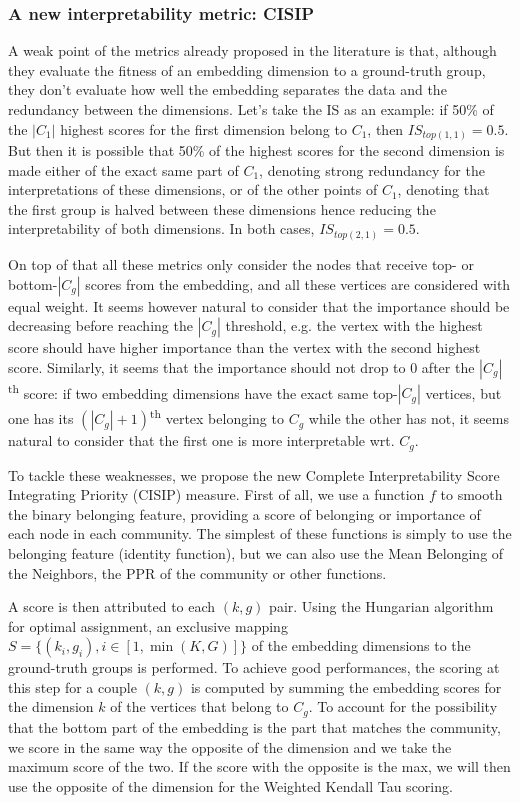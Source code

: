 \subsubsection{A new interpretability metric: CISIP}

A weak point of the metrics already proposed in the literature is that, although they evaluate the fitness of an embedding dimension to a ground-truth group, they don't evaluate how well the embedding separates the data and the redundancy between the dimensions. Let's take the IS as an example: if 50\% of the $|C_1|$ highest scores for the first dimension belong to $C_1$, then $IS_{top(1,1)} = 0.5$. But then it is possible that 50\% of the highest scores for the second dimension is made either of the exact same part of $C_1$, denoting strong redundancy for the interpretations of these dimensions, or of the other points of $C_1$, denoting that the first group is halved between these dimensions hence reducing the interpretability of both dimensions. In both cases, $IS_{top(2, 1)} = 0.5$.

On top of that all these metrics only consider the nodes that receive top- or bottom-$|C_g|$ scores from the embedding, and all these vertices are considered with equal weight. It seems however natural to consider that the importance should be decreasing before reaching the $|C_g|$ threshold, e.g. the vertex with the highest score should have higher importance than the vertex with the second highest score. Similarly, it seems that the importance should not drop to 0 after the $|C_g|$\textsuperscript{th} score: if two embedding dimensions have the exact same top-$|C_g|$ vertices, but one has its $(|C_g|+1)$\textsuperscript{th} vertex belonging to $C_g$ while the other has not, it seems natural to consider that the first one is more interpretable wrt. $C_g$. 

To tackle these weaknesses, we propose the new Complete Interpretability Score Integrating Priority (CISIP) measure. First of all, we use a function $f$ to smooth the binary belonging feature, providing a score of belonging or importance of each node in each community. The simplest of these functions is simply to use the belonging feature (identity function), but we can also use the Mean Belonging of the Neighbors, the PPR of the community or other functions.

A score is then attributed to each $(k, g)$ pair. Using the Hungarian algorithm for optimal assignment, an exclusive mapping $S = \{(k_i, g_i), i \in [1, \min(K, G)]\}$ of the embedding dimensions to the ground-truth groups is performed. To achieve good performances, the scoring at this step for a couple $(k, g)$ is computed by summing the embedding scores for the dimension $k$ of the vertices that belong to $C_g$. To account for the possibility that the bottom part of the embedding is the part that matches the community, we score in the same way the opposite of the dimension and we take the maximum score of the two. If the score with the opposite is the max, we will then use the opposite of the dimension for the Weighted Kendall Tau scoring.

